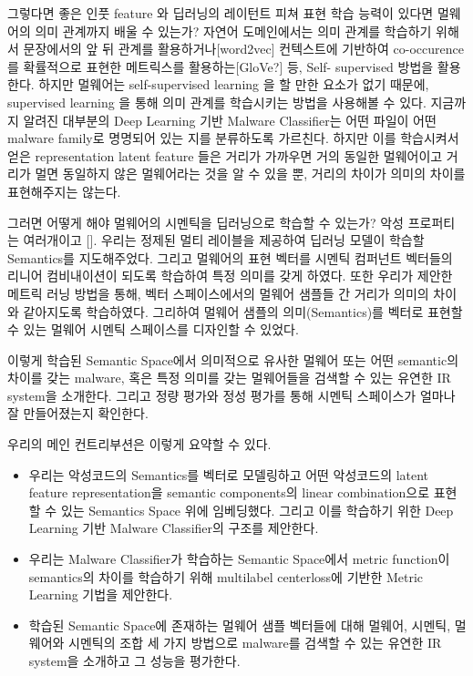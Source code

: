 그렇다면 좋은 인풋 feature 와 딥러닝의 레이턴트 피쳐 표현 학습 능력이 있다면 멀웨어의 의미 관계까지 배울 수 있는가? 자연어 도메인에서는 의미 관계를 학습하기 위해서 문장에서의 앞 뒤 관계를 활용하거나[word2vec] 컨텍스트에 기반하여 co-occurence 를 확률적으로 표현한 메트릭스를 활용하는[GloVe?] 등, Self- supervised 방법을 활용한다. 하지만 멀웨어는 self-supervised learning 을 할 만한 요소가 없기 때문에, supervised learning 을 통해 의미 관계를 학습시키는 방법을 사용해볼 수 있다. 지금까지 알려진 대부분의 Deep Learning 기반 Malware Classifier는 어떤 파일이 어떤 malware family로 명명되어 있는 지를 분류하도록 가르친다. 하지만 이를 학습시켜서 얻은 representation latent feature 들은 거리가 가까우면 거의 동일한 멀웨어이고 거리가 멀면 동일하지 않은 멀웨어라는 것을 알 수 있을 뿐, 거리의 차이가 의미의 차이를 표현해주지는 않는다.  

그러면 어떻게 해야 멀웨어의 시멘틱을 딥러닝으로 학습할 수 있는가? 악성 프로퍼티는 여러개이고 []. 우리는 정제된 멀티 레이블을 제공하여 딥러닝 모델이 학습할 Semantics를 지도해주었다. 그리고 멀웨어의 표현 벡터를 시멘틱 컴퍼넌트 벡터들의 리니어 컴비내이션이 되도록 학습하여 특정 의미를 갖게 하였다. 또한 우리가 제안한 메트릭 러닝 방법을 통해, 벡터 스페이스에서의 멀웨어 샘플들 간 거리가 의미의 차이와 같아지도록 학습하였다. 그리하여 멀웨어 샘플의 의미(Semantics)를 벡터로 표현할 수 있는 멀웨어 시멘틱 스페이스를 디자인할 수 있었다. 

이렇게 학습된 Semantic Space에서 의미적으로 유사한 멀웨어 또는 어떤 semantic의 차이를 갖는 malware, 혹은 특정 의미를 갖는 멀웨어들을 검색할 수 있는 유연한 IR system을 소개한다. 그리고 정량 평가와 정성 평가를 통해 시멘틱 스페이스가 얼마나 잘 만들어졌는지 확인한다.  

우리의 메인 컨트리부션은 이렇게 요약할 수 있다.

\begin{itemize}
\item 우리는 악성코드의 Semantics를 벡터로 모델링하고 어떤 악성코드의 latent feature representation을 semantic components의 linear combination으로 표현할 수 있는 Semantics Space 위에 임베딩했다. 그리고 이를 학습하기 위한 Deep Learning 기반 Malware Classifier의 구조를 제안한다.
\item 우리는 Malware Classifier가 학습하는 Semantic Space에서 metric function이 semantics의 차이를 학습하기 위해 multilabel centerloss에 기반한 Metric Learning 기법을 제안한다.
\item 학습된 Semantic Space에 존재하는 멀웨어 샘플 벡터들에 대해 멀웨어, 시멘틱, 멀웨어와 시멘틱의 조합 세 가지 방법으로 malware를 검색할 수 있는 유연한 IR system을 소개하고 그 성능을 평가한다.
\end{itemize}

